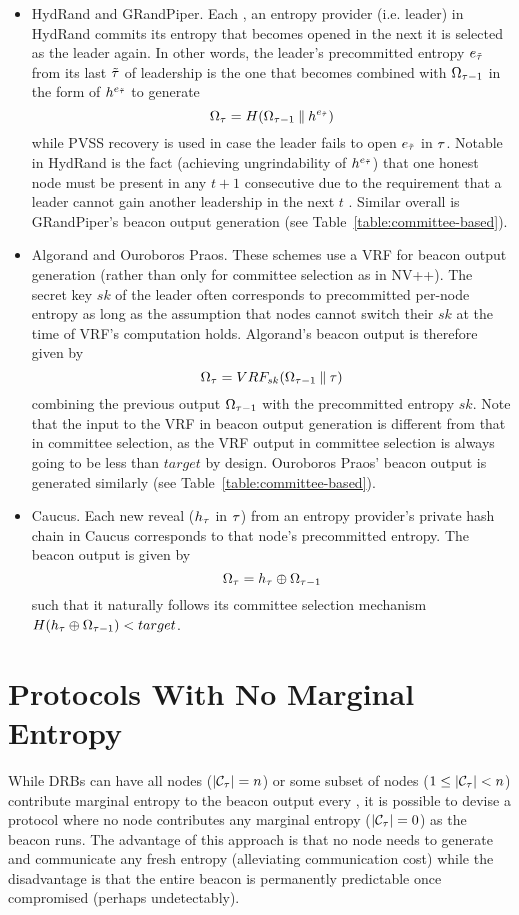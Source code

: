 \begin{itemize}
\item HydRand and GRandPiper. Each \epoch, an entropy provider (i.e. \epoch leader) in HydRand commits its entropy that becomes opened in the next \epoch it is selected as the leader again. In other words, the \epoch leader's precommitted entropy $e_{\tilde{\tau}}$ from its last \epoch $\tilde{\tau}$ of leadership is the one that becomes combined with $\Omega_{\tau - 1}$ in the form of $h^{e_{\tilde{\tau}}}$ to generate
\[
\Omega_\tau = H(\Omega_{\tau - 1} \mathbin\Vert h^{e_{\tilde{\tau}}})
\]
while PVSS recovery is used in case the leader fails to open $e_{\tilde{\tau}}$ in \epoch $\tau$. Notable in HydRand is the fact (achieving ungrindability of $h^{e_{\tilde{\tau}}}$) that one honest node must be present in any $t + 1$ consecutive \epochs due to the requirement that a leader cannot gain another leadership in the next $t$ \epochs. Similar overall is GRandPiper's beacon output generation (see Table~\ref{table:committee-based}).
\item Algorand and Ouroboros Praos. These schemes use a VRF for beacon output generation (rather than only for committee selection as in NV++). The secret key $sk$ of the \epoch leader often corresponds to precommitted per-node entropy as long as the assumption that nodes cannot switch their $sk$ at the time of VRF's computation holds. Algorand's beacon output is therefore given by
\[
\Omega_\tau = VRF_{sk}(\Omega_{\tau - 1} \mathbin\Vert \tau)
\]
combining the previous output $\Omega_{\tau - 1}$ with the precommitted entropy $sk$. Note that the input to the VRF in beacon output generation is different from that in committee selection, as the VRF output in committee selection is always going to be less than $target$ by design. Ouroboros Praos' beacon output is generated similarly (see Table~\ref{table:committee-based}).
\item Caucus. Each new reveal ($h_\tau$ in \epoch $\tau$) from an entropy provider's private hash chain in Caucus corresponds to that node's precommitted entropy. The beacon output is given by
\[
\Omega_\tau = h_\tau \oplus \Omega_{\tau - 1}
\]
such that it naturally follows its committee selection mechanism $H(h_\tau \oplus \Omega_{\tau - 1}) < target$.
\end{itemize}

\section{Protocols With No Marginal Entropy}
\label{section:dvrf}
While DRBs can have all nodes ($|\mathcal{C}_\tau| = n$) or some subset of nodes ($1 \leq |\mathcal{C}_\tau| < n$) contribute marginal entropy to the beacon output every \epoch, it is possible to devise a protocol where no node contributes any marginal entropy ($|\mathcal{C}_\tau| = 0$) as the beacon runs. The advantage of this approach is that no node needs to generate and communicate any fresh entropy (alleviating communication cost) while the disadvantage is that the entire beacon is permanently predictable once compromised (perhaps undetectably).


